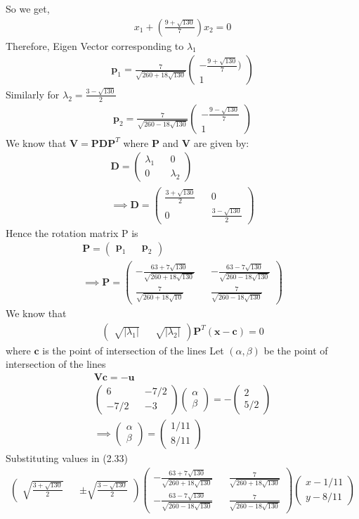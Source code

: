 \documentclass[journal,13pt,twocolumn]{IEEEtran}
\newcommand{\myvec}[1]{\ensuremath{\begin{pmatrix}#1\end{pmatrix}}}
\renewcommand{\vec}[1]{\mathbf{#1}}
\begin{document}
So we get,
\begin{align}
x_1 + (\frac{9+\sqrt{130}}{7})x_2 = 0
\end{align}
Therefore, Eigen Vector corresponding to $\lambda_1$
\begin{align}
\vec{p}_1 =\frac{7}{\sqrt{260+18\sqrt{130}}} \myvec{-\frac{9+\sqrt{130}}{7}) \\ 1}
\end{align}
Similarly for $\lambda_2 = \frac{3-\sqrt{130}}{2}$
\begin{align}
\vec{p}_2 =\frac{7}{\sqrt{260-18\sqrt{130}}} \myvec{-\frac{9-\sqrt{130}}{7} \\ 1}
\end{align}
We know that $\vec{V} = \vec{P}\vec{D}\vec{P}^T$ where $\vec{P}$ and $\vec{V}$ are given by:
\begin{align}
\vec{D} = \myvec{\lambda_1 && 0\\ 0 && \lambda_2}\\
\implies \vec{D} = \myvec{\frac{3+\sqrt{130}}{2} && 0\\ 0 &&\frac{3-\sqrt{130}}{2} }
\end{align}
Hence the rotation matrix P is
\begin{align}
\vec{P} = \myvec{\vec{p}_1 && \vec{p}_2}\\
\implies \vec{P} = \myvec{-\frac{63+7\sqrt{130}}{\sqrt{260+18\sqrt{130}}} && -\frac{63-7\sqrt{130}}{\sqrt{260-18\sqrt{130}}} \\ \frac{7}{\sqrt{260+18\sqrt{10}}} && \frac{7}{\sqrt{260-18\sqrt{130}}}}
\end{align}
We know that 
\begin{align}
\myvec{\sqrt{|\lambda_1|} && \sqrt{|\lambda_2|}}\vec{P}^T(\vec{x}-\vec{c}) = 0
\end{align}
where $\vec{c}$ is the point of intersection of the lines 
Let $(\alpha,\beta)$ be the point of intersection of the lines 
\begin{align}
\vec{V}\vec{c} = -\vec{u}\\
\myvec{6 && -7/2\\-7/2 && -3} \myvec{\alpha \\ \beta} = -\myvec{2 \\ 5/2}\\
\implies \myvec{\alpha \\ \beta} = \myvec{1/11 \\ 8/11}
\end{align}
Substituting values in (2.33)
\begin{align}
\myvec{ \sqrt{\frac{3+\sqrt{130}}{2}} && \pm\sqrt{\frac{3-\sqrt{130}}{2}}} 
\myvec{ -\frac{63+7\sqrt{130}}{\sqrt{260+18\sqrt{130}}} && \frac{7}{\sqrt{260+18\sqrt{130}}} \\ -\frac{63-7\sqrt{130}}{\sqrt{260-18\sqrt{130}}} && \frac{7}{\sqrt{260-18\sqrt{130}}}} 
\myvec{x-1/11 \\ y-8/11}
\end{align}
\end{document}
